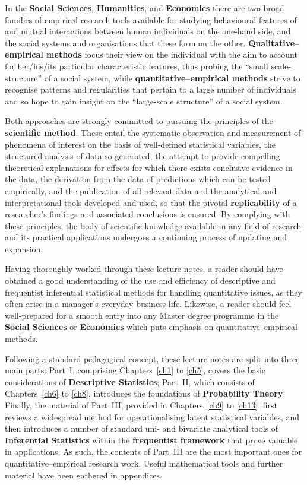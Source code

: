 \medskip
\noindent
In the \textbf{Social Sciences}, \textbf{Humanities}, and
\textbf{Economics} there are two broad families of empirical
research tools available for studying behavioural features of and
mutual interactions between human individuals on the one-hand side,
and the social systems and organisations that these form on the
other. \textbf{Qualitative--empirical methods} focus their view 
on the individual with the aim to account for her/his/its 
particular characteristic features, thus probing the ``small 
scale-structure'' of a social system, while
\textbf{quantitative--empirical methods} strive to recognise
patterns and regularities that pertain to a large number of
individuals and so hope to gain insight on the ``large-scale
structure'' of a social system.

\medskip
\noindent
Both approaches are strongly committed to pursuing the principles 
of the \textbf{scientific method}. These entail the systematic
observation and measurement of phenomena of interest on the basis 
of well-defined statistical variables, the structured analysis of 
data so generated, the attempt to provide compelling theoretical 
explanations for effects for which there exists conclusive 
evidence in the data, the derivation from the data of predictions 
which can be tested empirically, and the publication of all 
relevant data and the analytical and interpretational tools 
developed and used, so that the pivotal \textbf{replicability} of a 
researcher's findings and associated conclusions is ensured. By 
complying with these principles, the body of scientific knowledge 
available in any field of research and its practical applications
undergoes a continuing process of updating and expansion.

\medskip
\noindent
Having thoroughly worked through these lecture notes, a reader 
should have obtained a good understanding of the use and 
efficiency of descriptive and frequentist inferential statistical
methods for handling quantitative issues, as they often arise in a
manager's everyday business life. Likewise, a reader should feel
well-prepared for a smooth entry into any Master degree programme
in the \textbf{Social Sciences} or \textbf{Economics} which puts
emphasis on quantitative--empirical methods.

\medskip
\noindent
Following a standard pedagogical concept, these lecture notes are 
split into three main parts: Part~I, comprising
Chapters~\ref{ch1} to \ref{ch5}, covers the basic considerations 
of \textbf{Descriptive Statistics}; Part~II, which consists 
of Chapters~\ref{ch6} to \ref{ch8}, introduces the foundations of 
\textbf{Probability Theory}. Finally, the material of Part~III, 
provided in Chapters~\ref{ch9} to \ref{ch13}, first reviews a
widespread method for operationalising latent statistical 
variables, and then introduces a number of standard uni- and 
bivariate analytical tools of \textbf{Inferential Statistics}
within the \textbf{frequentist framework} that prove valuable in 
applications. As such, the contents of Part~III are the most 
important ones for quantitative--empirical research work. Useful 
mathematical tools and further material have been gathered in 
appendices.

